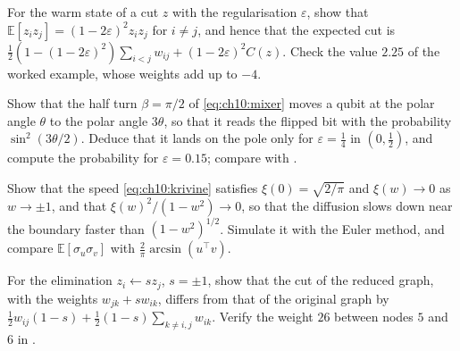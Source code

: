 \documentclass[handoutsbeamer.tex]{subfiles}
\begin{document}

\begin{frame}
\onp{\footnotesize}
\begin{exe}\label{exe:ch10:warm}
For the warm state of a cut $z$ with the regularisation $\varepsilon$, show that $\mathbb E[z_iz_j] = (1-2\varepsilon)^2z_iz_j$ for $i\ne j$, and hence that the expected cut is $\frac12(1-(1-2\varepsilon)^2)\sum_{i<j}w_{ij}+(1-2\varepsilon)^2C(z)$. Check the value $2.25$ of the worked example, whose weights add up to $-4$.
\end{exe}
\begin{exe}\label{exe:ch10:triple}
Show that the half turn $\beta = \pi/2$ of \eqref{eq:ch10:mixer} moves a qubit at the polar angle $\theta$ to the polar angle $3\theta$, so that it reads the flipped bit with the probability $\sin^2(3\theta/2)$. Deduce that it lands on the pole only for $\varepsilon = \frac14$ in $(0,\frac12)$, and compute the probability for $\varepsilon = 0.15$; compare with .
\end{exe}
\end{frame}

\begin{frame}
\onp{\footnotesize}
\begin{exe}\label{exe:ch10:speed}
Show that the speed \eqref{eq:ch10:krivine} satisfies $\xi(0) = \sqrt{2/\pi}$ and $\xi(w)\to0$ as $w\to\pm1$, and that $\xi(w)^2/(1-w^2)\to0$, so that the diffusion slows down near the boundary faster than $(1-w^2)^{1/2}$. Simulate it with the Euler method, and compare $\mathbb E[\sigma_u\sigma_v]$ with $\frac2\pi\arcsin(u^\top v)$.
\end{exe}
\begin{exe}[An elimination]\label{exe:ch10:elim}
For the elimination $z_i\leftarrow sz_j$, $s = \pm1$, show that the cut of the reduced graph, with the weights $w_{jk}+sw_{ik}$, differs from that of the original graph by $\frac12w_{ij}(1-s)+\frac12(1-s)\sum_{k\ne i,j}w_{ik}$. Verify the weight $26$ between nodes $5$ and $6$ in .
\end{exe}
\end{frame}

\begin{frame}[allowframebreaks]
\biblio
\end{frame}
\end{document}
